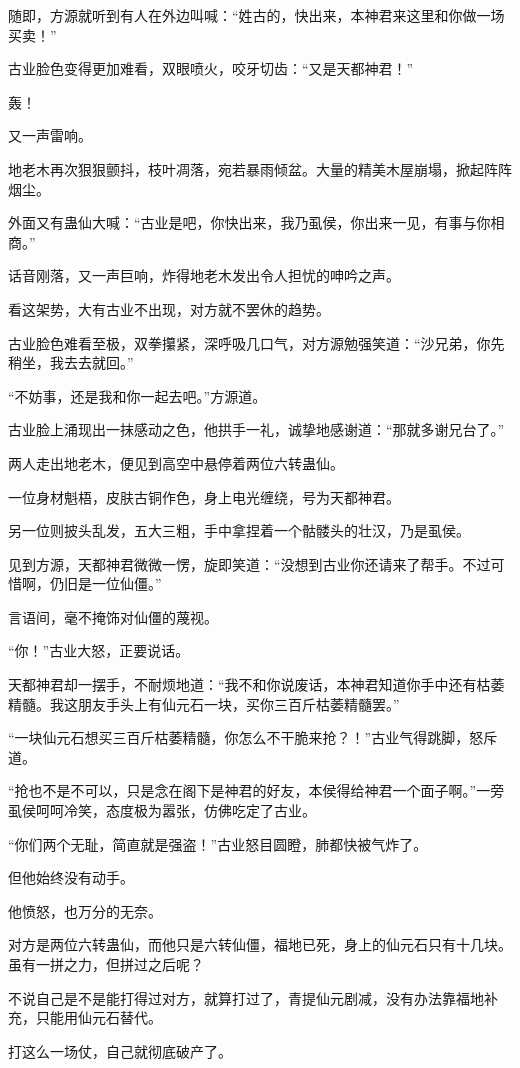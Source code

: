 \begin{this_body}
随即，方源就听到有人在外边叫喊：“姓古的，快出来，本神君来这里和你做一场买卖！”

古业脸色变得更加难看，双眼喷火，咬牙切齿：“又是天都神君！”

轰！

又一声雷响。

地老木再次狠狠颤抖，枝叶凋落，宛若暴雨倾盆。大量的精美木屋崩塌，掀起阵阵烟尘。

外面又有蛊仙大喊：“古业是吧，你快出来，我乃虱侯，你出来一见，有事与你相商。”

话音刚落，又一声巨响，炸得地老木发出令人担忧的呻吟之声。

看这架势，大有古业不出现，对方就不罢休的趋势。

古业脸色难看至极，双拳攥紧，深呼吸几口气，对方源勉强笑道：“沙兄弟，你先稍坐，我去去就回。”

“不妨事，还是我和你一起去吧。”方源道。

古业脸上涌现出一抹感动之色，他拱手一礼，诚挚地感谢道：“那就多谢兄台了。”

两人走出地老木，便见到高空中悬停着两位六转蛊仙。

一位身材魁梧，皮肤古铜作色，身上电光缠绕，号为天都神君。

另一位则披头乱发，五大三粗，手中拿捏着一个骷髅头的壮汉，乃是虱侯。

见到方源，天都神君微微一愣，旋即笑道：“没想到古业你还请来了帮手。不过可惜啊，仍旧是一位仙僵。”

言语间，毫不掩饰对仙僵的蔑视。

“你！”古业大怒，正要说话。

天都神君却一摆手，不耐烦地道：“我不和你说废话，本神君知道你手中还有枯萎精髓。我这朋友手头上有仙元石一块，买你三百斤枯萎精髓罢。”

“一块仙元石想买三百斤枯萎精髓，你怎么不干脆来抢？！”古业气得跳脚，怒斥道。

“抢也不是不可以，只是念在阁下是神君的好友，本侯得给神君一个面子啊。”一旁虱侯呵呵冷笑，态度极为嚣张，仿佛吃定了古业。

“你们两个无耻，简直就是强盗！”古业怒目圆瞪，肺都快被气炸了。

但他始终没有动手。

他愤怒，也万分的无奈。

对方是两位六转蛊仙，而他只是六转仙僵，福地已死，身上的仙元石只有十几块。虽有一拼之力，但拼过之后呢？

不说自己是不是能打得过对方，就算打过了，青提仙元剧减，没有办法靠福地补充，只能用仙元石替代。

打这么一场仗，自己就彻底破产了。


\end{this_body}
